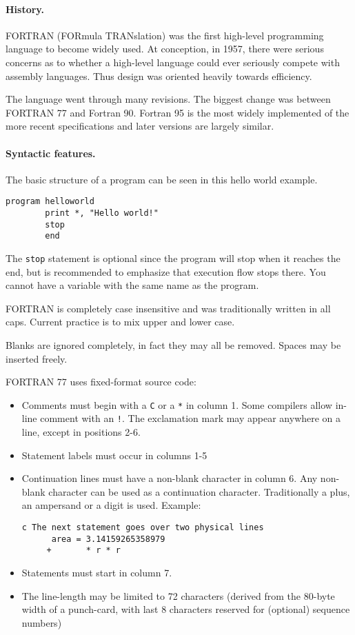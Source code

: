 \paragraph{History.}
FORTRAN (FORmula TRANslation) was the first high-level programming language to become widely used. At conception, in 1957, there were serious concerns as to whether a high-level language could ever seriously compete with assembly languages. Thus design was oriented heavily towards efficiency.

The language went through many revisions. The biggest change was between FORTRAN 77 and Fortran 90. Fortran 95 is the most widely implemented of the more recent specifications and later versions are largely similar.

\paragraph{Syntactic features.}
The basic structure of a program can be seen in this hello world example.
\begin{lstlisting}[language={[77]fortran}, style=program]
      program helloworld
        print *, "Hello world!"
        stop
        end
\end{lstlisting}
The \texttt{stop} statement is optional since the program will stop when it reaches the end, but is recommended to emphasize that execution flow stops there. You cannot have a variable with the same name as the program.

FORTRAN is completely case insensitive and was traditionally written in all caps. Current practice is to mix upper and lower case.

Blanks are ignored completely, in fact they may all be removed. Spaces may be inserted freely.

FORTRAN 77 uses fixed-format source code:
\begin{itemize}
\item Comments must begin with a \texttt{C} or a \texttt{*} in column 1. Some compilers allow in-line comment with an \texttt{!}. The exclamation mark may appear anywhere on a line, except in positions 2-6.
\item Statement labels must occur in columns 1-5
\item Continuation lines must have a non-blank character in column 6. Any non-blank character can be used as a continuation character. Traditionally a plus, an ampersand or a digit is used. Example:
\begin{lstlisting}[language={[77]fortran}, style=snippet]
c The next statement goes over two physical lines
      area = 3.14159265358979
     +       * r * r
\end{lstlisting}
\item Statements must start in column 7.
\item The line-length may be limited to 72 characters (derived from the 80-byte width of a punch-card, with last 8 characters reserved for (optional) sequence numbers)
\end{itemize}



